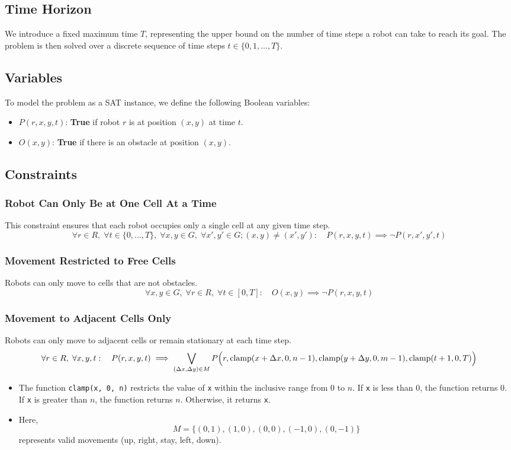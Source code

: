 \documentclass[8pt]{article}
\begin{document}
\subsection{Time Horizon}
We introduce a fixed maximum time $T$, representing the upper bound on the number of time steps a robot can take to reach its goal. The problem is then solved over a discrete sequence of time steps $t \in \{0, 1, \dots, T\}$.

\subsection{Variables}
To model the problem as a SAT instance, we define the following Boolean variables:
\begin{itemize}
    \item $P(r, x, y, t)$: \textbf{True} if robot $r$ is at position $(x, y)$ at time $t$.
    \item $O(x, y)$: \textbf{True} if there is an obstacle at position $(x,y)$.
\end{itemize}

\subsection{Constraints}
\subsubsection{Robot Can Only Be at One Cell At a Time}
This constraint ensures that each robot occupies only a single cell at any given time step.
\[
\forall r \in R,\;\forall t \in \{0,\dots,T\},\;\forall x,y \in G,\;\forall x',y' \in G; (x,y)\neq(x',y'):\quad P(r,x,y,t) \implies \neg P(r,x',y',t)
\]

\subsubsection{Movement Restricted to Free Cells}
Robots can only move to cells that are not obstacles.
\[
\forall x,y \in G,\; \forall r \in R,\; \forall t \in [0,T]:\quad O(x,y) \implies \neg P(r,x,y,t)
\]

\subsubsection{Movement to Adjacent Cells Only}
Robots can only move to adjacent cells or remain stationary at each time step.
\[
\forall r \in R,\; \forall x,y,t:\quad P(r,x,y,t) \implies \bigvee_{(\Delta x, \Delta y) \in M} P\Bigl(r,\text{clamp}(x+\Delta x,0,n-1),\text{clamp}(y+\Delta y,0,m-1),\text{clamp}(t+1,0,T)\Bigr)
\]
\begin{itemize}
    \item The function \texttt{clamp(x, 0, n)} restricts the value of \texttt{x} within the inclusive range from $0$ to $n$. If \texttt{x} is less than $0$, the function returns $0$. If \texttt{x} is greater than $n$, the function returns $n$. Otherwise, it returns \texttt{x}.
    \item Here, 
    \[
    M = \{(0, 1), (1, 0), (0, 0), (-1, 0), (0, -1)\}
    \]
    represents valid movements (up, right, stay, left, down).
\end{itemize}
\end{document}

